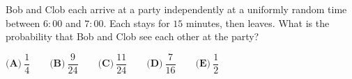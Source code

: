 Bob and Clob each arrive at a party independently at a uniformly random time between $6{:}00$ and $7{:}00$. Each stays for $15$ minutes, then leaves. What is the probability that Bob and Clob see each other at the party?

$\textbf{(A)}~\dfrac{1}{4}\qquad\textbf{(B)}~\dfrac{9}{24}\qquad\textbf{(C)}~\dfrac{11}{24}\qquad\textbf{(D)}~\dfrac{7}{16}\qquad\textbf{(E)}~\dfrac{1}{2}\qquad$

